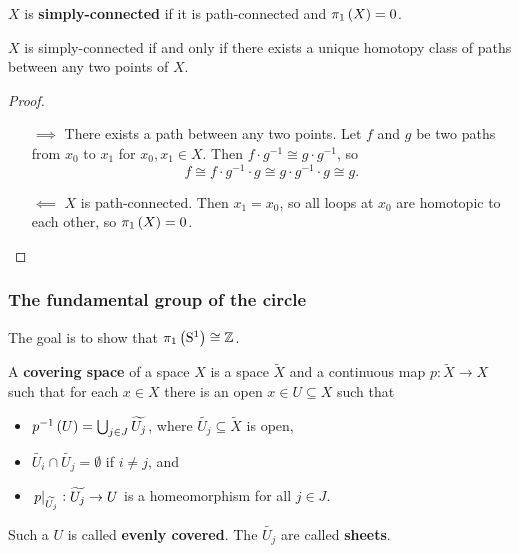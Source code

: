 \begin{definition*}
$ X $ is \textbf{simply-connected} if it is path-connected and $ \pi_1\br{X} = 0 $.
\end{definition*}

\begin{proposition}
\label{prop:1.6}
$ X $ is simply-connected if and only if there exists a unique homotopy class of paths between any two points of $ X $.
\end{proposition}

\begin{proof}
\hfill
\begin{itemize}
\item[$ \implies $] There exists a path between any two points. Let $ f $ and $ g $ be two paths from $ x_0 $ to $ x_1 $ for $ x_0, x_1 \in X $. Then $ f \cdot g^{-1} \cong g \cdot g^{-1} $, so
$$ f \cong f \cdot g^{-1} \cdot g \cong g \cdot g^{-1} \cdot g \cong g. $$
\item[$ \impliedby $] $ X $ is path-connected. Then $ x_1 = x_0 $, so all loops at $ x_0 $ are homotopic to each other, so $ \pi_1\br{X} = 0 $.
\end{itemize}
\end{proof}

\subsubsection{The fundamental group of the circle}

The goal is to show that $ \pi_1\br{\S^1} \cong \ZZ $.


\begin{definition*}
A \textbf{covering space} of a space $ X $ is a space $ \widetilde{X} $ and a continuous map $ p : \widetilde{X} \to X $ such that for each $ x \in X $ there is an open $ x \in U \subseteq X $ such that
\begin{itemize}
\item $ p^{-1}\br{U} = \bigcup_{j \in J} \widetilde{U_j} $, where $ \widetilde{U_j} \subseteq \widetilde{X} $ is open,
\item $ \widetilde{U_i} \cap \widetilde{U_j} = \emptyset $ if $ i \ne j $, and
\item $ \left. p \right|_{\widetilde{U_j}} : \widetilde{U_j} \to U $ is a homeomorphism for all $ j \in J $.
\end{itemize}
Such a $ U $ is called \textbf{evenly covered}. The $ \widetilde{U_j} $ are called \textbf{sheets}.
\end{definition*}

